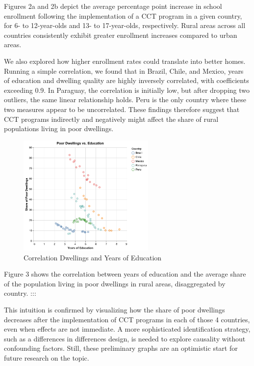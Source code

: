 \documentclass[
  10pt,
]{article}
\begin{document}
Figures 2a and 2b depict the average percentage point increase in school
enrollment following the implementation of a CCT program in a given
country, for 6- to 12-year-olds and 13- to 17-year-olds, respectively.
Rural areas across all countries consistently exhibit greater enrollment
increases compared to urban areas.

We also explored how higher enrollment rates could translate into better
homes. Running a simple correlation, we found that in Brazil, Chile, and
Mexico, years of education and dwelling quality are highly inversely
correlated, with coefficients exceeding 0.9. In Paraguay, the
correlation is initially low, but after dropping two outliers, the same
linear relationship holds. Peru is the only country where these two
measures appear to be uncorrelated. These findings therefore suggest
that CCT programs indirectly and negatively might affect the share of
rural populations living in poor dwellings.

\begin{figure}[H]

{\centering \includegraphics[width=0.6\textwidth,height=\textheight]{Graphs/corr_edu_dwelling.png}

}

\caption{Correlation Dwellings and Years of Education}

\end{figure}%

Figure 3 shows the correlation between years of education and the
average share of the population living in poor dwellings in rural areas,
disaggregated by country. :::

This intuition is confirmed by visualizing how the share of poor
dwellings decreases after the implementation of CCT programs in each of
those 4 countries, even when effects are not immediate. A more
sophisticated identification strategy, such as a differences in
differences design, is needed to explore causality without confounding
factors. Still, these preliminary graphs are an optimistic start for
future research on the topic.
\end{document}
